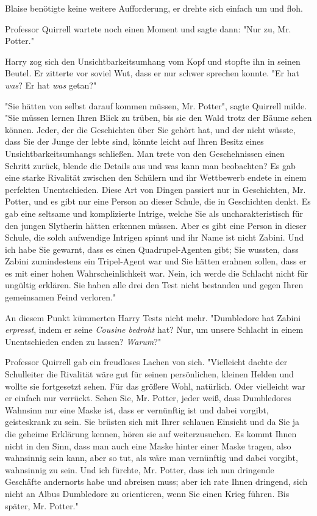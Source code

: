 {Blaise benötigte keine weitere Aufforderung, er drehte sich einfach um und floh.

Professor Quirrell wartete noch einen Moment und sagte dann: "Nur zu, Mr. Potter."

Harry zog sich den Unsichtbarkeitsumhang vom Kopf und stopfte ihn in seinen Beutel. Er zitterte vor soviel Wut, dass er nur schwer sprechen konnte. "Er hat \emph{was}? Er hat \emph{was} getan?"

"Sie hätten von selbst darauf kommen müssen, Mr. Potter", sagte Quirrell milde. "Sie müssen lernen Ihren Blick zu trüben, bis sie den Wald trotz der Bäume sehen können. Jeder, der die Geschichten über Sie gehört hat, und der nicht wüsste, dass Sie der Junge der lebte sind, könnte leicht auf Ihren Besitz eines Unsichtbarkeitsumhangs schließen. Man trete von den Geschehnissen einen Schritt zurück, blende die Details aus und was kann man beobachten? Es gab eine starke Rivalität zwischen den Schülern und ihr Wettbewerb endete in einem perfekten Unentschieden. Diese Art von Dingen passiert nur in Geschichten, Mr. Potter, und es gibt nur eine Person an dieser Schule, die in Geschichten denkt. Es gab eine seltsame und komplizierte Intrige, welche Sie als uncharakteristisch für den jungen Slytherin hätten erkennen müssen. Aber es gibt eine Person in dieser Schule, die solch aufwendige Intrigen spinnt und ihr Name ist nicht Zabini. Und ich habe Sie gewarnt, dass es einen Quadrupel-Agenten gibt; Sie wussten, dass Zabini zumindestens ein Tripel-Agent war und Sie hätten erahnen sollen, dass er es mit einer hohen Wahrscheinlichkeit war. Nein, ich werde die Schlacht nicht für ungültig erklären. Sie haben alle drei den Test nicht bestanden und gegen Ihren gemeinsamen Feind verloren."

An diesem Punkt kümmerten Harry Tests nicht mehr. "Dumbledore hat Zabini \emph{erpresst}, indem er seine \emph{Cousine bedroht} hat? Nur, um unsere Schlacht in einem Unentschieden enden zu lassen? \emph{Warum}?"

Professor Quirrell gab ein freudloses Lachen von sich. "Vielleicht dachte der Schulleiter die Rivalität wäre gut für seinen persönlichen, kleinen Helden und wollte sie fortgesetzt sehen. Für das größere Wohl, natürlich. Oder vielleicht war er einfach nur verrückt. Sehen Sie, Mr. Potter, jeder weiß, dass Dumbledores Wahnsinn nur eine Maske ist, dass er vernünftig ist und dabei vorgibt, geisteskrank zu sein. Sie brüsten sich mit Ihrer schlauen Einsicht und da Sie ja die geheime Erklärung kennen, hören sie auf weiterzusuchen. Es kommt Ihnen nicht in den Sinn, dass man auch eine Maske hinter einer Maske tragen, also wahnsinnig sein kann, aber so tut, als wäre man vernünftig und dabei vorgibt, wahnsinnig zu sein. Und ich fürchte, Mr. Potter, dass ich nun dringende Geschäfte andernorts habe und abreisen muss; aber ich rate Ihnen dringend, sich nicht an Albus Dumbledore zu orientieren, wenn Sie einen Krieg führen. Bis später, Mr. Potter."

}
